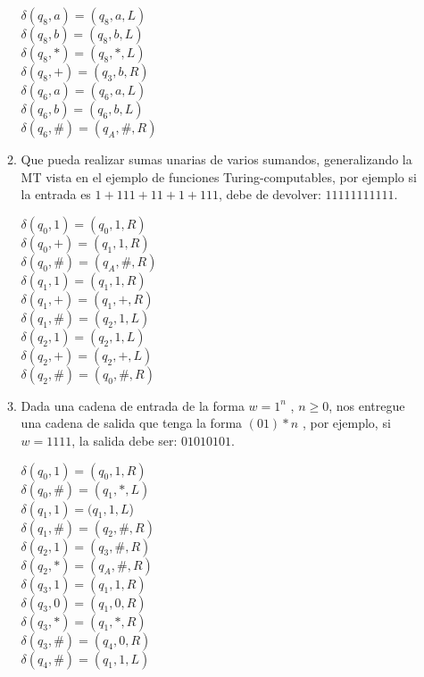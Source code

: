 \documentclass{article}
\begin{document}
\begin{enumerate}
\begin{enumerate}
    $\delta(q_8, a) = (q_8, a, L)$\\
    $\delta(q_8, b) = (q_8, b, L)$\\
    $\delta(q_8, *) = (q_8, *, L)$\\
    $\delta(q_8, +) = (q_3, b, R)$\\

    $\delta(q_6, a) = (q_6, a, L)$\\
    $\delta(q_6, b) = (q_6, b, L)$\\
    $\delta(q_6, \#) = (q_A, \#, R)$\\

  \item Que pueda realizar sumas unarias de varios sumandos, generalizando la MT
    vista en el ejemplo de funciones Turing-computables, por ejemplo si la
    entrada es $1+111+11+1+111$, debe de devolver: $11111111111$.

    $\delta(q_0, 1) = (q_0, 1, R)$\\
    $\delta(q_0, +) = (q_1, 1, R)$\\
    $\delta(q_0, \#) = (q_A, \#, R)$\\

    $\delta(q_1, 1) = (q_1, 1, R)$\\
    $\delta(q_1, +) = (q_1, +, R)$\\
    $\delta(q_1, \#) = (q_2, 1, L)$\\

    $\delta(q_2, 1) = (q_2, 1, L)$\\
    $\delta(q_2, +) = (q_2, +, L)$\\
    $\delta(q_2, \#) = (q_0, \#, R)$\\

  \item Dada una cadena de entrada de la forma $w = 1^n$ , $n \geq 0$, nos entregue
    una cadena de salida que tenga la forma $(01)*n$ , por ejemplo, si $w = 1111$,
    la salida debe ser: $01010101$.

    $\delta(q_0, 1) = (q_0, 1, R)$\\
    $\delta(q_0, \#) = (q_1, *, L)$\\

    $\delta(q_1, 1) = (q_1, 1, L$)\\
    $\delta(q_1, \#) = (q_2, \#, R)$\\

    $\delta(q_2, 1) = (q_3, \#, R)$\\
    $\delta(q_2, *) = (q_A , \#, R)$\\

    $\delta(q_3, 1) = (q_1, 1, R)$\\
    $\delta(q_3, 0) = (q_1, 0, R)$\\
    $\delta(q_3, *) = (q_1, *, R)$\\
    $\delta(q_3, \#) = (q_4, 0, R)$\\

    $\delta(q_4, \#) = (q_1, 1, L)$\\


  \end{enumerate}
\end{enumerate}
\end{document}
